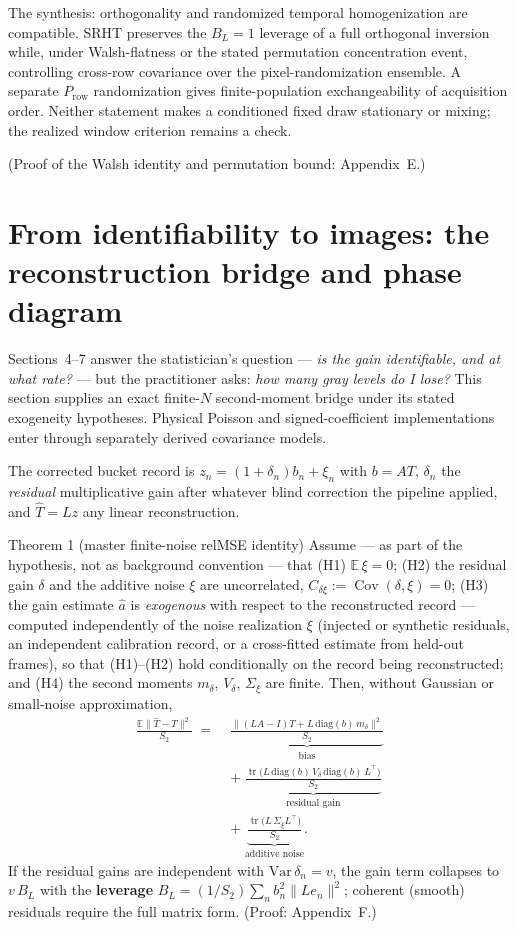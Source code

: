 The synthesis: orthogonality and randomized temporal homogenization are compatible. SRHT preserves the $B_L=1$ leverage of a full orthogonal inversion while, under Walsh-flatness or the stated permutation concentration event, controlling cross-row covariance over the pixel-randomization ensemble. A separate $P_{\mathrm{row}}$ randomization gives finite-population exchangeability of acquisition order. Neither statement makes a conditioned fixed draw stationary or mixing; the realized window criterion remains a check.

(Proof of the Walsh identity and permutation bound: Appendix~E.)

\section{From identifiability to images: the reconstruction bridge and phase diagram}

Sections~4--7 answer the statistician's question --- \emph{is the gain identifiable, and at what rate?} --- but the practitioner asks: \emph{how many gray levels do I lose?} This section supplies an exact finite-$N$ second-moment bridge under its stated exogeneity hypotheses. Physical Poisson and signed-coefficient implementations enter through separately derived covariance models.

The corrected bucket record is $z_n=(1+\delta_n)b_n+\xi_n$ with $b=AT$, $\delta_n$ the \emph{residual} multiplicative gain after whatever blind correction the pipeline applied, and $\hat T=Lz$ any linear reconstruction.

\begin{namedthm}{Theorem 1 (master finite-noise relMSE identity)}
Assume --- as part of the hypothesis, not as background convention --- that (H1) $\mathbb{E}\,\xi=0$; (H2) the residual gain $\delta$ and the additive noise $\xi$ are uncorrelated, $C_{\delta\xi}:=\operatorname{Cov}(\delta,\xi)=0$; (H3) the gain estimate $\hat a$ is \emph{exogenous} with respect to the reconstructed record --- computed independently of the noise realization $\xi$ (injected or synthetic residuals, an independent calibration record, or a cross-fitted estimate from held-out frames), so that (H1)--(H2) hold conditionally on the record being reconstructed; and (H4) the second moments $m_\delta$, $V_\delta$, $\Sigma_\xi$ are finite. Then, without Gaussian or small-noise approximation,
\begin{align*}
\frac{\mathbb{E}\|\hat T-T\|^2}{S_2}\;=\;&\underbrace{\frac{\|(LA-I)T+L\,\mathrm{diag}(b)\,m_\delta\|^2}{S_2}}_{\text{bias}}\\
&+\;\underbrace{\frac{\operatorname{tr}\!\big(L\,\mathrm{diag}(b)\,V_\delta\,\mathrm{diag}(b)\,L^\top\big)}{S_2}}_{\text{residual gain}}\\
&+\;\underbrace{\frac{\operatorname{tr}\!\big(L\,\Sigma_\xi L^\top\big)}{S_2}}_{\text{additive noise}}.
\end{align*}
If the residual gains are independent with $\mathrm{Var}\,\delta_n=v$, the gain term collapses to $v\,B_L$ with the \textbf{leverage} $B_L=(1/S_2)\sum_n b_n^2\|Le_n\|^2$; coherent (smooth) residuals require the full matrix form. (Proof: Appendix~F.)
\end{namedthm}

